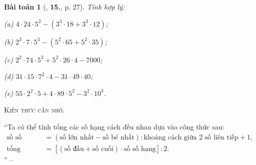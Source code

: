 \documentclass{article}
\numberwithin{equation}{section}
\newtheorem{baitoan}{Bài toán}[section]
\begin{document}
\begin{baitoan}[\cite{Trong_Toan_6_2021}, \textbf{15.}, p. 27]
	Tính hợp lý:
	\begin{enumerate*}
		\item[(a)] $4\cdot 24\cdot 5^2 - (3^3\cdot 18 + 3^3\cdot 12)$;
		\item[(b)] $2^3\cdot 7\cdot 5^3 - (5^2\cdot 65 + 5^2\cdot 35)$;
		\item[(c)] $2^2\cdot 74\cdot 5^2 + 5^2\cdot 26\cdot 4 - 7000$;
		\item[(d)] $31\cdot 15\cdot 7^2\cdot 4 - 31\cdot 49\cdot 40$;
		\item[(e)] $55\cdot 2^2\cdot 5 + 4\cdot 89\cdot 5^2 - 3^2\cdot 10^3$.
	\end{enumerate*}
\end{baitoan}
\noindent\textsc{Kiến thức cần nhớ.}
\begin{tcolorbox}
	``Ta có thể tính tổng các số hạng cách đều nhau dựa vào công thức sau:
	\begin{align*}
		\mbox{số số hạng} &= (\mbox{số lớn nhất} - \mbox{số bé nhất}):\mbox{khoảng cách giữa 2 số liên tiếp} + 1,\\
		\mbox{tổng} &= [(\mbox{số đầu} + \mbox{số cuối})\cdot\mbox{số số hạng}]:2.
	\end{align*}
	'' -- \cite[p. 29]{Trong_Toan_6_2021}
\end{tcolorbox}
\end{document}
